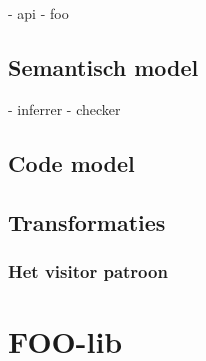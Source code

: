 \TODO

- api
- foo

\subsection{Semantisch model}
\label{subsection:devel-semantic-model}

\TODO

- inferrer
- checker

\subsection{Code model}
\label{subsection:devel-code-model}

\TODO

\subsection{Transformaties}
\label{subsection:transformations}

\TODO

\subsubsection{Het visitor patroon}
\label{subsubsection:devel-visitor-pattern}

\TODO

\section{FOO-lib}
\label{section:devel-foo-lib}

\TODO
